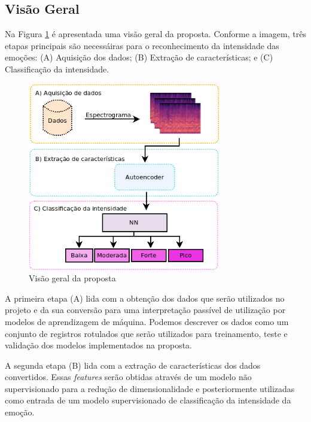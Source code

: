 \subsection{Visão Geral}

Na Figura \ref{fig:visaogeralproposta} é apresentada uma visão geral da proposta. Conforme a imagem, três etapas principais são necessáiras para o reconhecimento da intensidade das emoções: (A) Aquisição dos dados; (B) Extração de características; e (C) Classificação da intensidade.

\begin{figure}[!h]
\centering
\includegraphics[width=0.75\textwidth]{imagens/arquitetura-visao-geral.png}
\caption{\label{fig:visaogeralproposta}Visão geral da proposta}
\end{figure}

A primeira etapa (A) lida com a obtenção dos dados que serão utilizados no projeto e da sua conversão para uma interpretação passível de utilização por modelos de aprendizagem de máquina. Podemos descrever os dados como um conjunto de registros rotulados que serão utilizados para treinamento, teste e validação dos modelos implementados na proposta.

A segunda etapa (B) lida com a extração de características dos dados convertidos. Essas \textit{features} serão obtidas através de um modelo não supervisionado para a redução de dimensionalidade e posteriormente utilizadas como entrada de um modelo supervisionado de classificação da intensidade da emoção.

